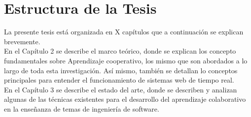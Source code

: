 \section{Estructura de la Tesis}
La presente tesis está organizada en X capítulos que a continuación se explican brevemente.\\

En el Capítulo 2 se describe el marco teórico, donde se explican los concepto fundamentales sobre Aprendizaje cooperativo, los mismo que son abordados a lo largo de toda esta investigación. Así mismo, también se detallan lo conceptos principales para entender el funcionamiento de sistemas web de tiempo real.\\

En el Capítulo 3 se describe el estado del arte, donde se describen y analizan algunas de las técnicas existentes para el desarrollo del aprendizaje colaborativo en la enseñanza de temas de ingeniería de software.

